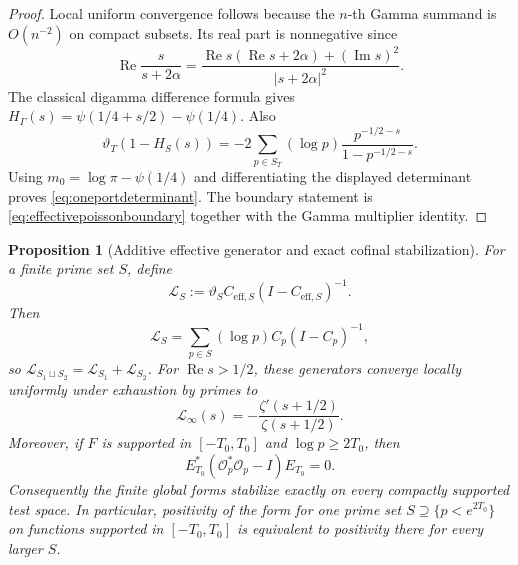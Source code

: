 \documentclass[11pt]{amsart}
\newtheorem{proposition}[theorem]{Proposition}
\theoremstyle{definition}
\theoremstyle{remark}
\begin{document}
\begin{proof}
Local uniform convergence follows because the $n$-th Gamma summand is
$O(n^{-2})$ on compact subsets.  Its real part is nonnegative since
\[
 \operatorname{Re}\frac{s}{s+2\alpha}
 =\frac{\operatorname{Re}s(\operatorname{Re}s+2\alpha)
         +(\operatorname{Im}s)^2}{|s+2\alpha|^2}.
\]
The classical digamma difference formula gives
\(
 H_\Gamma(s)=\psi(1/4+s/2)-\psi(1/4)
\).
Also
\[
 \vartheta_T(1-H_S(s))
 =-2\sum_{p\in S_T}(\log p)
       \frac{p^{-1/2-s}}{1-p^{-1/2-s}}.
\]
Using $m_0=\log\pi-\psi(1/4)$ and differentiating the displayed determinant
proves \eqref{eq:oneportdeterminant}.  The boundary statement is
\eqref{eq:effectivepoissonboundary} together with the Gamma multiplier
identity.
\end{proof}

\begin{proposition}[Additive effective generator and exact cofinal
stabilization]
\label{prop:effectivecofinalgenerator}
For a finite prime set $S$, define
\begin{equation}\label{eq:additiveeffectivegenerator}
 \mathcal L_S:=\vartheta_SC_{\mathrm{eff},S}
                    (I-C_{\mathrm{eff},S})^{-1}.
\end{equation}
Then
\begin{equation}\label{eq:additiveeffectivegeneratorsum}
 \mathcal L_S
 =\sum_{p\in S}(\log p)C_p(I-C_p)^{-1},
\end{equation}
so $\mathcal L_{S_1\sqcup S_2}=\mathcal L_{S_1}+\mathcal L_{S_2}$.
For $\operatorname{Re}s>1/2$, these generators converge locally uniformly
under exhaustion by primes to
\begin{equation}\label{eq:additiveeffectivegeneratorlimit}
 \mathcal L_\infty(s)
 =-\frac{\zeta'(s+1/2)}{\zeta(s+1/2)}.
\end{equation}
Moreover, if $F$ is supported in $[-T_0,T_0]$ and
$\log p\ge2T_0$, then
\begin{equation}\label{eq:inactiveplacestabilization}
 E_{T_0}^*(\mathcal O_p^*\mathcal O_p-I)E_{T_0}=0.
\end{equation}
Consequently the finite global forms stabilize exactly on every compactly
supported test space.  In particular, positivity of the form for one prime
set $S\supseteq\{p<e^{2T_0}\}$ on functions supported in $[-T_0,T_0]$ is
equivalent to positivity there for every larger $S$.
\end{proposition}
\end{document}
